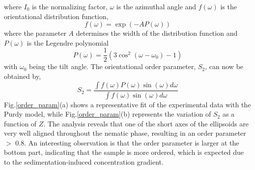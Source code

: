 \documentclass[aps,prl,preprint,superscriptaddress]{revtex4-1} %
\begin{document}
\noindent where $I_0$ is the normalizing factor, $\omega$ is the azimuthal angle and $f(\omega)$ is the orientational distribution function,
\begin{equation}
\label{eq3:}
f(\omega)=\exp(-AP(\omega))
\end{equation} 
\noindent where the parameter $A$ determines the width of the distribution function and $P(\omega)$ is the Legendre polynomial
\begin{equation}
\label{eq4:}
P(\omega)=\frac{1}{2}(3\cos^2(\omega-\omega_0)-1)
\end{equation} 
\noindent with $\omega_0$ being the tilt angle. The orientational order parameter, $S_2$, can now be obtained by,
\begin{equation}
\label{eq5:}
S_2= \frac{\int f(\omega)P(\omega)\sin(\omega)d\omega}{\int f(\omega)\sin(\omega)d\omega}
\end{equation}
\noindent Fig.\ref{order_param}(a) shows a representative fit of the experimental data with the Purdy model, while Fig.\ref{order_param}(b) represents the variation of $S_2$ as a function of $Z$. The analysis reveals that one of the short axes of the ellipsoids are very well aligned throughout the nematic phase, resulting in an order parameter $>$ 0.8. An interesting observation is that the order parameter is larger at the bottom part, indicating that the sample is more ordered, which is expected due to the sedimentation-induced concentration gradient.\par
\end{document}
